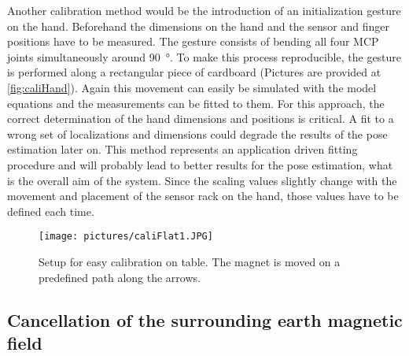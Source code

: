 Another calibration method would be the introduction of an initialization gesture on the hand. Beforehand the dimensions on the hand and the sensor and finger positions have to be measured. The gesture consists of bending all four \ac{MCP} joints simultaneously around \SI{90}{\degree}. To make this process reproducible, the gesture is performed along a rectangular piece of cardboard (Pictures are provided at \ref{fig:caliHand}). Again this movement can easily be simulated with the model equations and the measurements can be fitted to them. For this approach, the correct determination of the hand dimensions and positions is critical. A fit to a wrong set of localizations and dimensions could degrade the results of the pose estimation later on. This method represents an application driven fitting procedure and will probably lead to better results for the pose estimation, what is the overall aim of the system. Since the scaling values slightly change with the movement and placement of the sensor rack on the hand, those values have to be defined each time.

\begin{figure}[h]
\centering
\texttt{[image: pictures/caliFlat1.JPG]}
\caption{Setup for easy calibration on table. The magnet is moved on a predefined path along the arrows. }
\label{fig:caliFlat}
\end{figure}

\subsection{Cancellation of the surrounding earth magnetic field} \label{subsec:earthEli}

